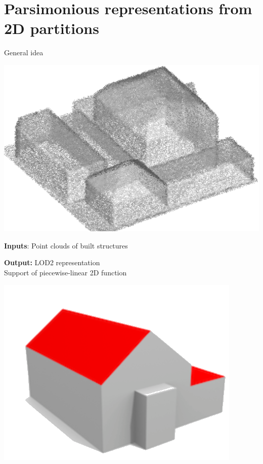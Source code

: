 \graphicspath{{images/arrangements/}}

\section{Parsimonious representations from 2D partitions}

\begin{frame}{General idea}
	\scriptsize
	\begin{center}
		\begin{minipage}{0.2\linewidth}
			\includegraphics[width=\linewidth]{pipeline/pointcloud_crop}
		\end{minipage}%
		\hspace{0.5cm}
		\begin{minipage}{0.7\linewidth}
			\textbf{Inputs}: Point clouds of built structures
		\end{minipage}
	\end{center}

	\begin{center}
		\begin{minipage}{0.6\linewidth}
			\textbf{Output:} LOD2 representation\\
			Support of piecewise-linear 2D function
		\end{minipage}%
		\begin{minipage}{0.2\linewidth}
			\centering
			\includegraphics[width=\linewidth]{lod2}
		\end{minipage}
	\end{center}
	

\end{frame}
